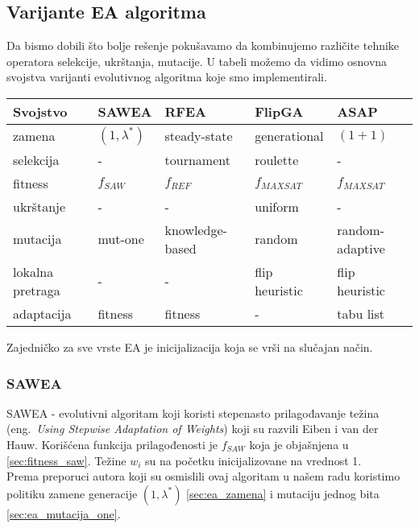 \documentclass{article}
\begin{document}
\subsection{Varijante EA algoritma}
\label{sec:ea_varijante}

Da bismo dobili što bolje rešenje pokušavamo da kombinujemo različite tehnike operatora selekcije, ukrštanja, mutacije. U tabeli možemo da vidimo osnovna svojstva varijanti evolutivnog algoritma koje smo implementirali.
 
\begin{table}[h!]
\centering
{}\label{tab:EA} 
\begin{tabular}{ |p{2.8cm}|p{2.3cm}|p{2.3cm}|p{2.3cm}|p{2.3cm}|}
 \hline
 Svojstvo & SAWEA & RFEA & FlipGA & ASAP \\
 \hline
 zamena & $(1, \lambda^*)$ & steady-state & generational & $(1 + 1)$ \\
 \hline
 selekcija & - & tournament & roulette & - \\
 \hline
 fitness &	$f_{SAW}$ & $f_{REF}$ & $f_{MAXSAT}$ & $f_{MAXSAT}$ \\
 \hline
 ukrštanje & - & - & uniform & - \\
 \hline
 mutacija & mut-one & knowledge-based & random & random-adaptive \\
 \hline
 lokalna pretraga & - & - & flip heuristic & flip heuristic \\
 \hline
 adaptacija & fitness & fitness &  - & tabu list \\
 \hline
\end{tabular}
\end{table}
Zajedničko za sve vrste EA je inicijalizacija koja se vrši na slučajan način.

\subsubsection{SAWEA}
\label{sec:ea_sawea}
SAWEA - evolutivni algoritam koji koristi stepenasto prilagođavanje težina (eng.~{\em Using Stepwise Adaptation of Weights}) \cite{ea_with_table, ea_without_table}koji su razvili Eiben i van der Hauw. Korišćena funkcija prilagođenosti je $f_{SAW}$  koja je objašnjena u \ref{sec:fitness_saw}. Težine $w_i$  su na početku inicijalizovane na vrednost 1. \\

Prema preporuci autora koji su osmislili ovaj algoritam u našem radu koristimo politiku zamene generacije $(1,\lambda^*)$ \ref{sec:ea_zamena} i mutaciju jednog bita \ref{sec:ea_mutacija_one}.\\
\end{document}
